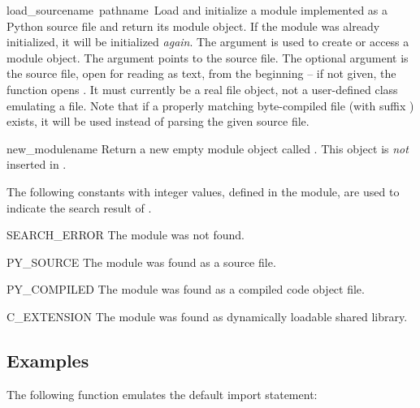 \begin{funcdesc}{load_source}{name\, pathname\, }
Load and initialize a module implemented as a Python source file and
return its module object.  If the module was already initialized, it
will be initialized {\em again}.  The  argument is used to
create or access a module object.  The  argument points
to the source file.  The optional  argument is the source
file, open for reading as text, from the beginning -- if not given,
the function opens .  It must currently be a real file
object, not a user-defined class emulating a file.  Note that if a
properly matching byte-compiled file (with suffix ) exists,
it will be used instead of parsing the given source file.
\end{funcdesc}

\begin{funcdesc}{new_module}{name}
Return a new empty module object called .  This object is
{\em not} inserted in .
\end{funcdesc}

The following constants with integer values, defined in the module,
are used to indicate the search result of .

\begin{datadesc}{SEARCH_ERROR}
The module was not found.
\end{datadesc}

\begin{datadesc}{PY_SOURCE}
The module was found as a source file.
\end{datadesc}

\begin{datadesc}{PY_COMPILED}
The module was found as a compiled code object file.
\end{datadesc}

\begin{datadesc}{C_EXTENSION}
The module was found as dynamically loadable shared library.
\end{datadesc}

\subsection{Examples}
The following function emulates the default import statement:

